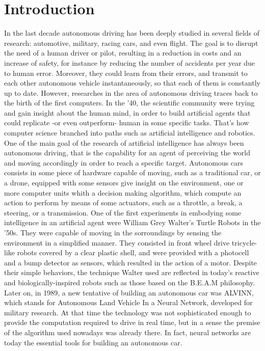 \chapter{Introduction}
\label{Introduction}
\thispagestyle{empty}

In the last decade autonomous driving has been deeply studied in several fields of research: automotive, military, racing cars, and even flight. The goal is to disrupt the need of a human driver or pilot, resulting in a reduction in costs and an increase of safety, for instance by reducing the number of accidents per year due to human error. Moreover, they could learn from their errors, and transmit to each other autonomous vehicle instantaneously, so that each of them is constantly up to date.
However, researches in the area of autonomous driving traces back to the birth of the first computers. In the '40, the scientific community were trying and gain insight about the human mind, in order to build artificial agents that could replicate -or even outperform- human in some specific tasks.
That's how computer science branched into paths such as artificial intelligence and robotics.
One of the main goal of the research of artificial intelligence has always been autonomous driving, that is the capability for an agent of perceiving the world and moving accordingly in order to reach a specific target.
Autonomous cars consists in some piece of hardware capable of moving, such as a traditional car, or a drone, equipped with some sensors give insight on the environment, one or more computer units whith a decision making algorithm, which compute an action to perform by means of some actuators, such as a throttle, a break, a steering, or a transmission.
One of the first experiments in embodying some intelligence in an artificial agent were William Grey Walter's Turtle Robots in the '50s. They were capable of moving in the sorroundings by sensing the environment in a simplified manner. They consisted in front wheel drive tricycle-like robots covered by a clear plastic shell, and were provided with a photocell and a bump detector as sensors, which resulted in the action of a motor. Despite their simple behaviors, the technique Walter used are reflected in today's reactive and biologically-inspired robots such as those based on the B.E.A.M philosophy.
Later on, in 1989, a new tentative of building an autonomous car was ALVINN, which stands for Autonomous Land Vehicle In a Neural Network, developed for military research.
At that time the technology was not sophisticated enough to provide the computation required to drive in real time, but in a sense the premise of the algorithm used nowadays was already there. In fact, neural networks are today the essential tools for building an autonomous car.
